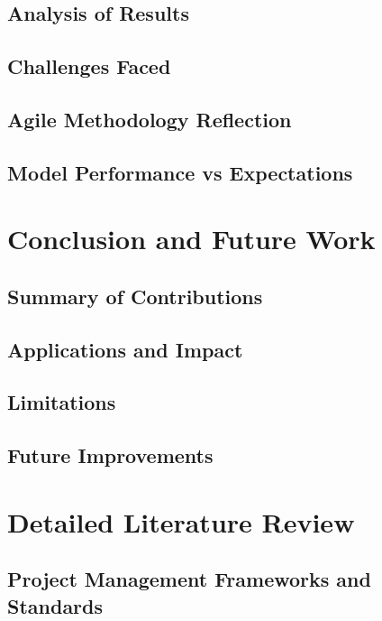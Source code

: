\documentclass{report}
\begin{document}
\section{Analysis of Results}
\section{Challenges Faced}
\section{Agile Methodology Reflection}
\section{Model Performance vs Expectations}

\chapter{Conclusion and Future Work}  %
\section{Summary of Contributions}
\section{Applications and Impact}
\section{Limitations}
\section{Future Improvements}


\printbibliography%

\appendix
\chapter{Detailed Literature Review}
\section{Project Management Frameworks and Standards}
\end{document}
